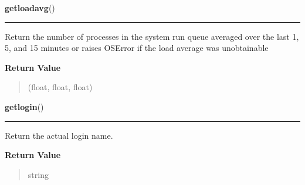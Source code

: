 \hspace{.8\funcindent}\begin{boxedminipage}{\funcwidth}

    \raggedright \textbf{getloadavg}()

    \vspace{-1.5ex}

    \rule{\textwidth}{0.5\fboxrule}
\setlength{\parskip}{2ex}
    Return the number of processes in the system run queue averaged over 
    the last 1, 5, and 15 minutes or raises OSError if the load average was
    unobtainable

\setlength{\parskip}{1ex}
      \textbf{Return Value}
    \vspace{-1ex}

      \begin{quote}
      (float, float, float)

      \end{quote}

    \end{boxedminipage}

    \label{os:getlogin}

    \vspace{0.5ex}

\hspace{.8\funcindent}\begin{boxedminipage}{\funcwidth}

    \raggedright \textbf{getlogin}()

    \vspace{-1.5ex}

    \rule{\textwidth}{0.5\fboxrule}
\setlength{\parskip}{2ex}
    Return the actual login name.

\setlength{\parskip}{1ex}
      \textbf{Return Value}
    \vspace{-1ex}

      \begin{quote}
      string

      \end{quote}

    \end{boxedminipage}

    \label{os:getpgid}

    \vspace{0.5ex}

